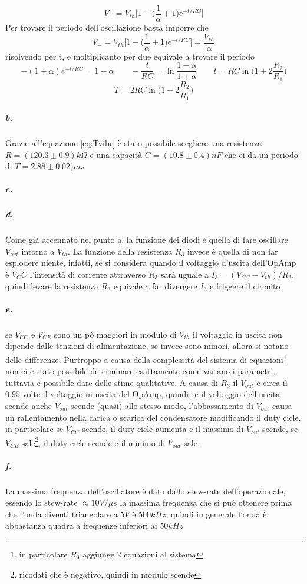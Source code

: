 \documentclass{article}
\begin{document}
		\[
			V_-=V_{th}\bigg[1-\bigg(\frac{1}{\alpha}+1\bigg)e^{-t/RC}\bigg]
		\]		
		Per trovare il periodo dell'oscillazione basta imporre che 
		\[
			V_-=V_{th}\bigg[1-\bigg(\frac{1}{\alpha}+1\bigg)e^{-t/RC}\bigg]=\frac{V_{th}}{\alpha}
		\]
		risolvendo per t, e moltiplicanto per due equivale a trovare il periodo
		\[
			-(1+\alpha)e^{-t/RC}=1-\alpha\qquad -\frac{t}{RC}=\ln\frac{1-\alpha}{1+\alpha}\qquad t=RC\ln\bigg(1+2\frac{R_2}{R_1} \bigg)
		\]
		\begin{equation}
			T=2RC\ln\bigg(1+2\frac{R_2}{R_1} \bigg)
		\label{eq:Tvibr}
		\end{equation}
	\subparagraph{b.}
		Grazie all'equazione \ref{eq:Tvibr} è stato possibile scegliere una resistenza $R=(120.3\pm0.9)k\Omega$ e una capacità $C=(10.8\pm0.4)nF$ che ci da un periodo di $T=2.88\pm0.02)ms$
	\subparagraph{c.}
		
	\subparagraph{d.}
		Come già accennato nel punto a. la funzione dei diodi è quella di fare oscillare $V_{out}$ intorno a $V_{th}$.\newline 
		La funzione della resistenza $R_3$ invece è quella di non far esplodere niente, infatti, se si considera quando il voltaggio d'uscita dell'OpAmp è $V_CC$ l'intensità di corrente attraverso $R_3$ sarà uguale a  $I_3=(V_{CC}-V_{th})/R_3$, quindi levare la resistenza $R_3$ equivale a far divergere $I_3$ e friggere il circuito 
	\subparagraph{e.}
		se $V_{CC}$ e $V_{CE}$ sono un pò maggiori in modulo di $V_{th}$ il voltaggio in uscita non dipende dalle tenzioni di alimentazione, se invece sono minori, allora si notano delle differenze.\newline
		Purtroppo a causa della complessità del sistema di equazioni\footnote{in particolare $R_3$ aggiunge 2 equazioni al sistema} non ci è stato possibile determinare esattamente come variano i parametri, tuttavia è possibile dare delle stime qualitative.\newline
		A causa di $R_3$ il $V_{out}$ è circa il $0.95$ volte il voltaggio in uscita del OpAmp, quindi se il voltaggio dell'uscita scende anche $V_{out}$ scende (quasi) allo stesso modo, l'abbassamento di $V_{out}$ causa un rallentamento nella carica o scarica del condensatore modificando il duty cicle.\newline
		in particolare se $V_{CC}$ scende, il duty cicle aumenta e il massimo di $V_{out}$ scende, se $V_{CE}$ sale\footnote{ricodati che è negativo, quindi in modulo scende}, il duty cicle scende e il minimo di $V_{out}$ sale.
	\subparagraph{f.}
		La massima frequenza dell'oscillatore è dato dallo stew-rate dell'operazionale, essendo lo stew-rate $\approx 10V/\mu s$ la massima frequenza che si può ottenere prima che l'onda diventi triangolare a $5V$ è $500kHz$, quindi in generale l'onda è abbastanza quadra a frequenze inferiori ai $50kHz$
\end{document}
